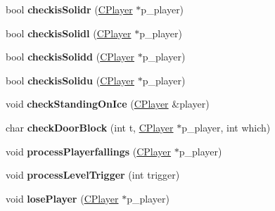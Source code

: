 \begin{DoxyCompactItemize}
\item 
\hypertarget{class_c_play_game_vorticon_ac2e00520079b9e9a7187ee27d47e31c8}{
bool {\bfseries checkisSolidr} (\hyperlink{class_c_player}{CPlayer} $\ast$p\_\-player)}
\label{class_c_play_game_vorticon_ac2e00520079b9e9a7187ee27d47e31c8}

\item 
\hypertarget{class_c_play_game_vorticon_a30681868116be0a3bf2e46d02863197b}{
bool {\bfseries checkisSolidl} (\hyperlink{class_c_player}{CPlayer} $\ast$p\_\-player)}
\label{class_c_play_game_vorticon_a30681868116be0a3bf2e46d02863197b}

\item 
\hypertarget{class_c_play_game_vorticon_a7d3fc2068c4c97f8ebfd0c09e39a068d}{
bool {\bfseries checkisSolidd} (\hyperlink{class_c_player}{CPlayer} $\ast$p\_\-player)}
\label{class_c_play_game_vorticon_a7d3fc2068c4c97f8ebfd0c09e39a068d}

\item 
\hypertarget{class_c_play_game_vorticon_adc7ace783dca78b8a0b6259dfd0695b9}{
bool {\bfseries checkisSolidu} (\hyperlink{class_c_player}{CPlayer} $\ast$p\_\-player)}
\label{class_c_play_game_vorticon_adc7ace783dca78b8a0b6259dfd0695b9}

\item 
\hypertarget{class_c_play_game_vorticon_a168a1dc8edb0cfa68ab856c864d45dba}{
void {\bfseries checkStandingOnIce} (\hyperlink{class_c_player}{CPlayer} \&player)}
\label{class_c_play_game_vorticon_a168a1dc8edb0cfa68ab856c864d45dba}

\item 
\hypertarget{class_c_play_game_vorticon_a7e354d1b591b822717e81d6513e821e6}{
char {\bfseries checkDoorBlock} (int t, \hyperlink{class_c_player}{CPlayer} $\ast$p\_\-player, int which)}
\label{class_c_play_game_vorticon_a7e354d1b591b822717e81d6513e821e6}

\item 
\hypertarget{class_c_play_game_vorticon_a78124b9b06c1f4cf70fdab56023e2db1}{
void {\bfseries processPlayerfallings} (\hyperlink{class_c_player}{CPlayer} $\ast$p\_\-player)}
\label{class_c_play_game_vorticon_a78124b9b06c1f4cf70fdab56023e2db1}

\item 
\hypertarget{class_c_play_game_vorticon_a318cfe609ab8c4b9a4c3af5bdf419637}{
void {\bfseries processLevelTrigger} (int trigger)}
\label{class_c_play_game_vorticon_a318cfe609ab8c4b9a4c3af5bdf419637}

\item 
\hypertarget{class_c_play_game_vorticon_aa0a1de7d0c5c7ad7e24f81ade0586517}{
void {\bfseries losePlayer} (\hyperlink{class_c_player}{CPlayer} $\ast$p\_\-player)}
\label{class_c_play_game_vorticon_aa0a1de7d0c5c7ad7e24f81ade0586517}


\end{DoxyCompactItemize}

